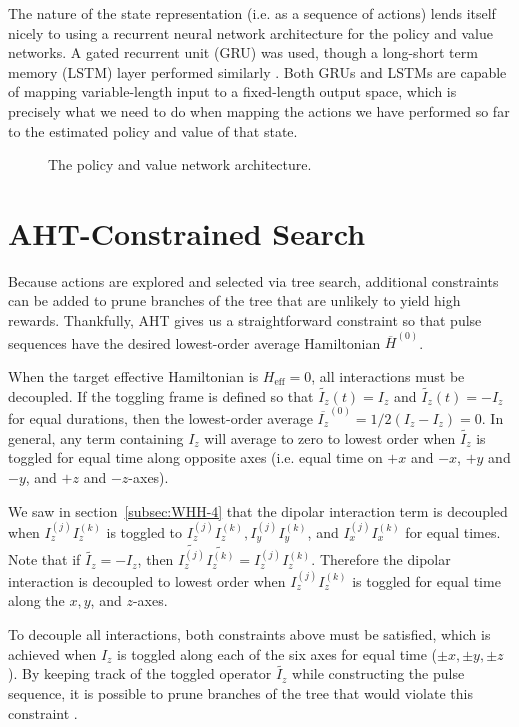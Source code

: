 The nature of the state representation (i.e. as a sequence of actions) lends itself nicely to using a recurrent neural network architecture for the policy and value networks. A gated recurrent unit (GRU) was used, though a long-short term memory (LSTM) layer performed similarly \cite{cho2014learning, lstm}.
Both GRUs and LSTMs are capable of mapping variable-length input to a fixed-length output space, which is precisely what we need to do when mapping the actions we have performed so far to the estimated policy and value of that state.

\begin{figure}[H]
    \centering
    
    \caption{The policy and value network architecture.}
    \label{fig:nn}
\end{figure}


\section{AHT-Constrained Search}\label{sec:AHT-constraints}

Because actions are explored and selected via tree search, additional constraints can be added to prune branches of the tree that are unlikely to yield high rewards. Thankfully, AHT gives us a straightforward constraint so that pulse sequences have the desired lowest-order average Hamiltonian $\overline{H}^{(0)}$.

When the target effective Hamiltonian is $H_\text{eff} = 0$, all interactions must be decoupled. If the toggling frame is defined so that $\widetilde{I_z}(t) = I_z$ and $\widetilde{I_z}(t) = -I_z$ for equal durations, then the lowest-order average $\overline{I_z}^{(0)} = 1/2(I_z - I_z) = 0$. In general, any term containing $I_z$ will average to zero to lowest order when $\widetilde{I_z}$ is toggled for equal time along opposite axes (i.e. equal time on $+x$ and $-x$, $+y$ and $-y$, and $+z$ and $-z$-axes).

We saw in section~\ref{subsec:WHH-4} that the dipolar interaction term is decoupled when $I_z^{(j)}I_z^{(k)}$ is toggled to $I_z^{(j)}I_z^{(k)}, I_y^{(j)}I_y^{(k)}$, and $I_x^{(j)}I_x^{(k)}$ for equal times. Note that if $\widetilde{I_z} = -I_z$, then $\widetilde{I_z^{(j)}}\widetilde{I_z^{(k)}} = I_z^{(j)}I_z^{(k)}$.
Therefore the dipolar interaction is decoupled to lowest order when $I_z^{(j)}I_z^{(k)}$ is toggled for equal time along the $x, y$, and $z$-axes.

To decouple all interactions, both constraints above must be satisfied, which is achieved when $I_z$ is toggled along each of the six axes for equal time ($\pm x, \pm y, \pm z$). By keeping track of the toggled operator $\widetilde{I_z}$ while constructing the pulse sequence, it is possible to prune branches of the tree that would violate this constraint%
.


